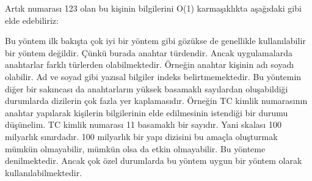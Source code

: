 \documentclass[a4paper,10pt,turkish]{sphinxmanual}
\begin{document}
\begin{sphinxVerbatim}[commandchars=\\\{\}]
\PYG{p}{[}\PYG{p}{]}
\end{sphinxVerbatim}

\sphinxAtStartPar
Artık numarası 123 olan bu kişinin bilgilerini O(1) karmaşıklıkta aşağıdaki gibi elde
edebiliriz:

\begin{sphinxVerbatim}[commandchars=\\\{\}]
\PYG{p}{[}\PYG{p}{]}
\end{sphinxVerbatim}

\sphinxAtStartPar
Bu yöntem ilk bakışta çok iyi bir yöntem gibi gözükse de genellikle kullanılabilir bir
yöntem değildir. Çünkü burada anahtar  türdendir. Ancak uygulamalarda anahtarlar
farklı türlerden olabilmektedir. Örneğin anahtar kişinin adı soyadı olabilir. Ad ve soyad
gibi yazısal bilgiler indeks belirtmemektedir. Bu yöntemin diğer bir sakıncası da
anahtarların yüksek basamaklı sayılardan oluşabildiği durumlarda dizilerin çok fazla yer
kaplamasıdır. Örneğin TC kimlik numarasının anahtar yapılarak kişilerin bilgilerinin elde
edilmesinin istendiği bir durumu düşünelim. TC kimlik numarası 11 basamaklı bir sayıdır.
Yani skalası 100 milyarlık sınırdadır. 100 milyarlık bir yapı dizisini bu amaçla oluşturmak
mümkün olmayabilir, mümkün olsa da etkin olmayabilir. Bu yönteme  denilmektedir. Ancak çok özel durumlarda bu yöntem uygun bir yöntem olarak
kullanılabilmektedir.
\end{document}
